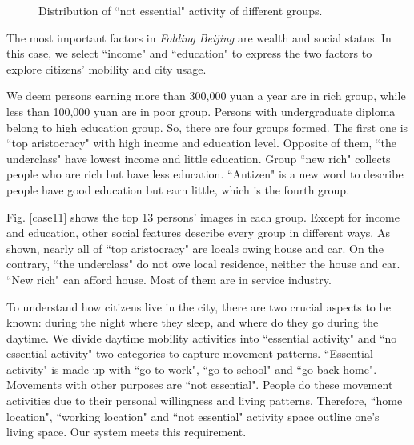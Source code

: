 \begin{figure}
\hspace{5pt}
\caption{Distribution of ``not essential" activity of different groups.}
\label{case13}
\end{figure}
The most important factors in \textit{Folding Beijing} are wealth and social status. In this case, we select ``income" and ``education" to express the two factors to explore citizens' mobility and city usage.

We deem persons earning more than 300,000 yuan a year are in rich group, while less than 100,000 yuan are in poor group. Persons with undergraduate diploma belong to high education group. So, there are four groups formed. The first one is ``top aristocracy" with high income and education level. Opposite of them, ``the underclass" have lowest income and little education. Group ``new rich" collects people who are rich but have less education. ``Antizen" is a new word to describe people have good education but earn little, which is the fourth group.

Fig. \ref{case11} shows the top 13 persons' images in each group. Except for income and education, other social features describe every group in different ways. As shown, nearly all of ``top aristocracy" are locals owing house and car. On the contrary, ``the underclass" do not owe local residence, neither the house and car. ``New rich" can afford house. Most of them are in service industry.

To understand how citizens live in the city, there are two crucial aspects to be known: during the night where they sleep, and where do they go during the daytime.
We divide daytime mobility activities into ``essential activity" and ``no essential activity" two categories to capture movement patterns. ``Essential activity" is made up with ``go to work", ``go to school" and ``go back home". Movements with other purposes are ``not essential". People do these movement activities due to their personal willingness and living patterns. Therefore, ``home location", ``working location" and ``not essential" activity space outline one's living space. Our system meets this requirement.

